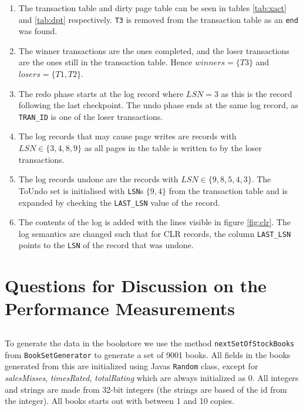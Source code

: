 \documentclass[a4paper, 11pt]{article}
\begin{document}
\begin{enumerate}
    \item The transaction table and dirty page table can be seen in tables \ref{tab:xact}
and \ref{tab:dpt} respectively. \texttt{T3} is removed from the transaction
table as an \texttt{end} was found.
    \item The winner transactions are the ones completed, and the loser transactions
are the ones still in the transaction table. Hence $winners = \{T3\}$ and $losers =
\{T1,T2\}$.
    \item The redo phase starts at the log record where $LSN=3$ as this is the
record following the last checkpoint. The undo phase ends at the same log
record, as \texttt{TRAN\_ID} is one of the loser transactions.
    \item The log records that may cause page writes are records with
    $LSN \in \{3,4,8,9\}$ as all pages in
the table is written to by the loser transactions.
    \item The log records undone are the records with $LSN \in \{9,8,5,4,3\}$. The
    ToUndo set is initialised with \texttt{LSN}s $\{9,4\}$ from the transaction table and is
    expanded by checking the \texttt{LAST\_LSN} value of the record.
    \item The contents of the log is added with the lines visible in figure
    \ref{fig:clr}. The log semantics are changed such that for CLR records, the
    column \texttt{LAST\_LSN} points to the \texttt{LSN} of the record that was undone.
\end{enumerate}




\section{Questions for Discussion on the Performance Measurements} %
\label{sec:questions_for_discussion_on_the_performance_measure_ments}

\subsection{} %
To generate the data in the bookstore we use the method \texttt{nextSetOfStockBooks} from \texttt{BookSetGenerator} to generate a set of 9001 books. All fields in the books generated from this are initialized using Javas \texttt{Random} class, except for \textit{salesMisses}, \textit{timesRated}, \textit{totalRating} which are always initialized as 0. All integers and strings are made from 32-bit integers (the strings are based of the id from the integer). All books starts out with between 1 and 10 copies.
\end{document}

